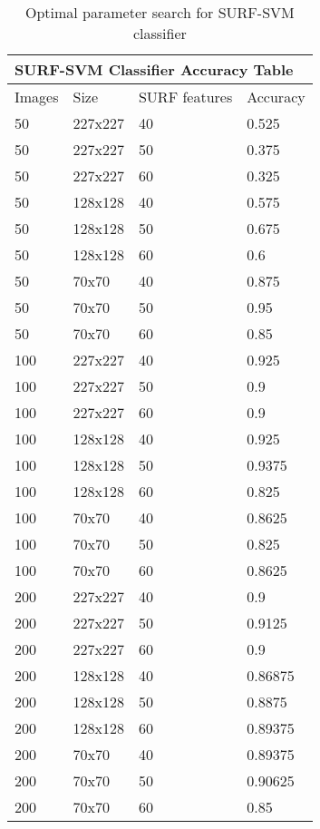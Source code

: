 \begin{table}[ht]
\centering
\begin{tabular}{|l|l|l|l|}
\hline
\multicolumn{4}{|l|}{SURF-SVM Classifier Accuracy Table} \\ \hline
Images  &  Size & SURF features & Accuracy \\ \hline
50 & 227x227 & 40 & 0.525 \\ \hline
50 & 227x227 & 50 & 0.375 \\ \hline
50 & 227x227 & 60 & 0.325 \\ \hline
50 & 128x128 & 40 & 0.575 \\ \hline
50 & 128x128 & 50 & 0.675 \\ \hline
50 & 128x128 & 60 & 0.6 \\ \hline
50 & 70x70 & 40 & 0.875 \\ \hline
50 & 70x70 & 50 & 0.95 \\ \hline
50 & 70x70 & 60 & 0.85 \\ \hline
100 & 227x227 & 40 & 0.925 \\ \hline
100 & 227x227 & 50 & 0.9 \\ \hline
100 & 227x227 & 60 & 0.9 \\ \hline
100 & 128x128 & 40 & 0.925 \\ \hline
100 & 128x128 & 50 & 0.9375 \\ \hline
100 & 128x128 & 60 & 0.825 \\ \hline
100 & 70x70 & 40 & 0.8625 \\ \hline
100 & 70x70 & 50 & 0.825 \\ \hline
100 & 70x70 & 60 & 0.8625 \\ \hline
200 & 227x227 & 40 & 0.9 \\ \hline
200 & 227x227 & 50 & 0.9125 \\ \hline
200 & 227x227 & 60 & 0.9 \\ \hline
200 & 128x128 & 40 & 0.86875 \\ \hline
200 & 128x128 & 50 & 0.8875 \\ \hline
200 & 128x128 & 60 & 0.89375 \\ \hline
200 & 70x70 & 40 & 0.89375 \\ \hline
200 & 70x70 & 50 & 0.90625 \\ \hline
200 & 70x70 & 60 & 0.85 \\ \hline
\end{tabular}
\caption{Optimal parameter search for SURF-SVM classifier}
\label{table:surf_stats}
\end{table}

